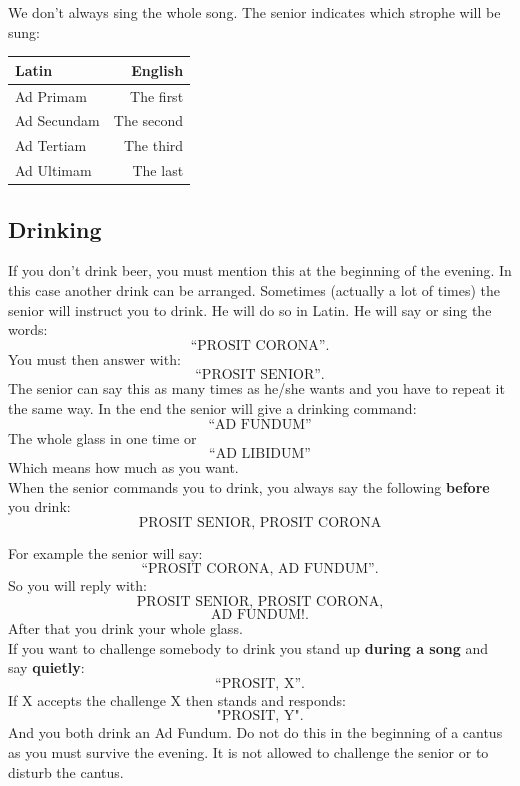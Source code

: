 \documentclass[a5paper]{article}
\begin{document}
We don't always sing the whole song. The senior indicates which strophe will be sung: 

\begin{table}[ht!]
\centering
\begin{tabular}{ l|r}
Latin & English \\
\hline
Ad Primam & The first \\
Ad Secundam & The second \\
Ad Tertiam & The third \\
Ad Ultimam & The last \\
\end{tabular}
\label{tab:stropheindicators}
\end{table}


\subsection{Drinking} %
\label{sub:drinking}

If you don't drink beer, you must mention this at the beginning of the evening. In this case another drink can be arranged.
Sometimes (actually a lot of times) the senior will instruct you to drink. He will do so in Latin. He will say or sing the words: $$\text{``PROSIT CORONA''.}$$ You must then answer with: $$\text{``PROSIT SENIOR''.}$$ The senior can say this as many times as he/she wants and you have to repeat it the same way. In the end the senior will give a drinking command:
$$\text{``AD FUNDUM''}$$ The whole glass in one time or $$\text{``AD LIBIDUM''}$$ Which means how much as you want.\\

When the senior commands you to drink, you always say the following \textbf{before} you drink: $$\text{PROSIT SENIOR, PROSIT CORONA}$$

For example the senior will say: $$\text{``PROSIT CORONA, AD FUNDUM''.}$$ So you will reply with: $$\text{PROSIT SENIOR, PROSIT CORONA,}$$$$\text{AD FUNDUM!.}$$ 
After that you drink your whole glass. \\

If you want to challenge somebody to drink you stand up \textbf{during a song} and say \textbf{quietly}: $$\text{``PROSIT, X''.}$$ If X accepts the challenge X then stands and responds: $$\text{"PROSIT, Y".}$$ And you both drink an Ad Fundum. Do not do this in the beginning of a cantus as you must survive the evening. It is not allowed to challenge the senior or to disturb the cantus.\\
\end{document}

